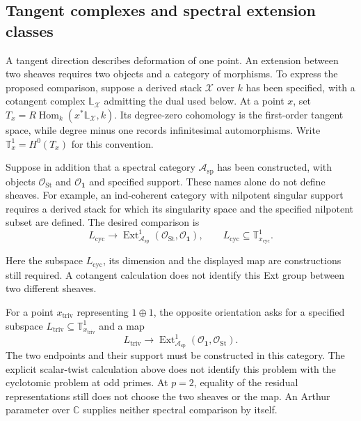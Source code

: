 \subsection{Tangent complexes and spectral extension classes}
\label{v4-arith:ic:w10-d:prop:spectral-ext1-s1}
A tangent direction describes deformation of one point. An extension
between two sheaves requires two objects and a category of morphisms.
To express the proposed comparison, suppose a derived stack
$\mathcal X$ over $k$ has been specified, with a cotangent complex
$\mathbb L_{\mathcal X}$ admitting the dual used below. At a point $x$,
set $T_x=R\operatorname{Hom}_k(x^*\mathbb L_{\mathcal X},k)$.
Its degree-zero cohomology is the first-order tangent space,
while degree minus one records infinitesimal automorphisms.
Write $\mathbb T^1_x=H^0(T_x)$ for this convention.

Suppose in addition that a spectral category
$\mathcal A_{\mathrm{sp}}$ has been constructed, with objects
$\mathcal O_{\mathrm{St}}$ and $\mathcal O_{\mathbf1}$ and specified
support. These names alone do not define sheaves.
For example, an ind-coherent category with nilpotent singular support
requires a derived stack for which its singularity space and the
specified nilpotent subset are defined. The desired comparison is
\begin{equation}\label{v4-arith:ic:w10-d:eq:spectral-ext1-s1}
 L_{\mathrm{cyc}}\longrightarrow
 \operatorname{Ext}^1_{\mathcal A_{\mathrm{sp}}}
          (\mathcal O_{\mathrm{St}},\mathcal O_{\mathbf1}),
 \qquad L_{\mathrm{cyc}}\subseteq\mathbb T^1_{x_{\mathrm{cyc}}}.
\end{equation}

Here the subspace $L_{\mathrm{cyc}}$, its dimension and the displayed
map are constructions still required. A cotangent calculation does
not identify this Ext group between two different sheaves.
\begin{remark}
\label{v4-arith:ic:w10-d:cor:spectral-ext1-s0}
For a point $x_{\mathrm{triv}}$ representing $1\oplus1$, the opposite
orientation asks for a specified subspace
$L_{\mathrm{triv}}\subseteq\mathbb T^1_{x_{\mathrm{triv}}}$ and a map
\[
 L_{\mathrm{triv}}\longrightarrow
 \operatorname{Ext}^1_{\mathcal A_{\mathrm{sp}}}
       (\mathcal O_{\mathbf1},\mathcal O_{\mathrm{St}}).
\]
The two endpoints and their support must be constructed in this category.
The explicit scalar-twist calculation above does not identify this
problem with the cyclotomic problem at odd primes. At $p=2$, equality
of the residual representations still does not choose the two sheaves
or the map. An Arthur parameter over $\mathbb C$ supplies neither
spectral comparison by itself.
\end{remark}


